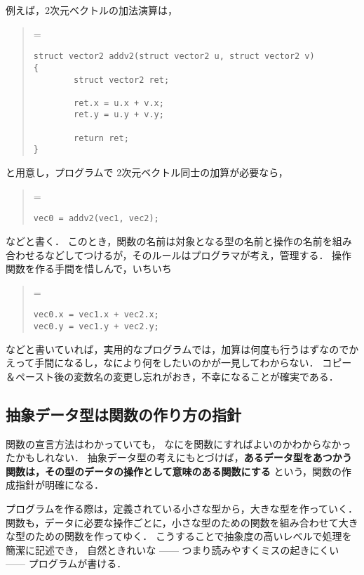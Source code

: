 \documentclass[11pt,a4,epsf]{jarticle}
\def\linesparpage#1{\baselineskip=\textheight\divide\baselineskip#1}
\begin{document}
例えば，2次元ベクトルの加法演算は，
\begin{quote}
\linesparpage{50}
\begin{verbatim}
struct vector2 addv2(struct vector2 u, struct vector2 v)
{
        struct vector2 ret;

        ret.x = u.x + v.x;
        ret.y = u.y + v.y;

        return ret;
}
\end{verbatim}
\end{quote}
と用意し，プログラムで 2次元ベクトル同士の加算が必要なら，
\begin{quote}
\linesparpage{50}
\begin{verbatim}
vec0 = addv2(vec1, vec2);
\end{verbatim}
\end{quote}
などと書く．
このとき，関数の名前は対象となる型の名前と操作の名前を組み合わせるなどしてつけるが，そのルールはプログラマが考え，管理する．
操作関数を作る手間を惜しんで，いちいち
\begin{quote}
\linesparpage{50}
\begin{verbatim}
vec0.x = vec1.x + vec2.x;
vec0.y = vec1.y + vec2.y;
\end{verbatim}
\end{quote}
などと書いていれば，実用的なプログラムでは，加算は何度も行うはずなのでかえって手間になるし，なにより何をしたいのかが一見してわからない．
コピー＆ペースト後の変数名の変更し忘れがおき，不幸になることが確実である．

\subsection{抽象データ型は関数の作り方の指針} %

関数の宣言方法はわかっていても，
なにを関数にすればよいのかわからなかったかもしれない．
抽象データ型の考えにもとづけば，{\bf あるデータ型をあつかう関数は，その型のデータの操作として意味のある関数にする}
という，関数の作成指針が明確になる．

プログラムを作る際は，定義されている小さな型から，大きな型を作っていく．
関数も，データに必要な操作ごとに，小さな型のための関数を組み合わせて大きな型のための関数を作ってゆく．
こうすることで抽象度の高いレベルで処理を簡潔に記述でき，
自然ときれいな ------ つまり読みやすくミスの起きにくい ------
プログラムが書ける．
\end{document}
